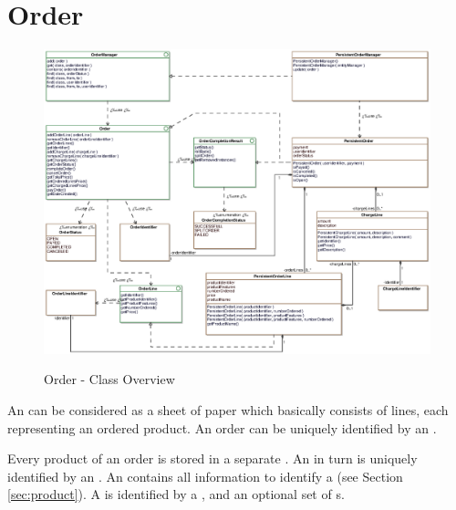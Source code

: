 \section{Order}
\label{sec:order}

\begin{figure}
	\centering
  \includegraphics[height=1.0\textwidth,angle=90]{images/Order_Overview.eps}
	\label{order_overview}
	\caption{Order - Class Overview}
\end{figure}

An  can be considered as a sheet of paper which basically consists of lines, each representing an ordered product.
An order can be uniquely identified by an .

Every product of an order is stored in a separate .
An  in turn is uniquely identified by an .
An  contains all information to identify a  (see Section \ref{sec:product}).
A  is identified by a , and an optional set of s.
\\

